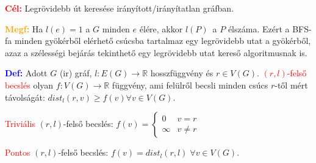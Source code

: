 \documentclass[../../szobeli.tex]{subfiles}
\begin{document}
\begin{itemize}
        \textbf{\textcolor{red}{Cél:}} Legrövidebb út keresése irányított/irányítatlan gráfban.

        \textbf{\textcolor{orange}{Megf:}} Ha $l(e) = 1 $ a $G$ minden $e$ élére, akkor $l(P)$ a $P$ élszáma. Ezért a BFS-fa minden gyökérből elérhető csúcsba tartalmaz egy legrövidebb utat a gyökérből, azaz a szélességi bejárás tekinthető egy legrövidebb utat kereső algoritmusnak is. 

        \textbf{\textcolor{blue}{Def:}} Adott $G$ (ir) gráf, $l : E(G) \rightarrow \mathbb{R}$ hosszfüggvény és $r \in V(G)$. \textcolor{red}{$(r,l)$-felső becslés} olyan $f: V(G) \rightarrow \mathbb{R}$ függvény, ami felülről becsli minden csúcs $r$-től mért távolságát: $dist_l (r,v) \geq f(v) \forall v \in V(G)$.

        \textcolor{red}{Triviális} $(r,l)$-felső becslés:
        $
            f(v) = \begin{cases}
                0 & v = r \\
                \infty & v \neq r
            \end{cases}
        $

        \textcolor{red}{Pontos} $(r,l)$-felső becslés: $f(v) = dist_l(r,l)\; \forall v \in V(G)$.
    \end{itemize}
\end{document}
